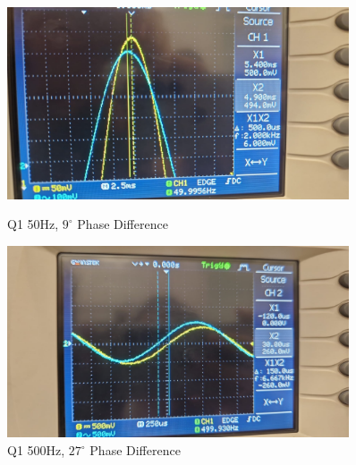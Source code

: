 \begin{figure}[h]
    \centering
    \begin{minipage}{0.5\textwidth}
        \includegraphics[width=0.9\textwidth , height=0.15\textheight]{assets/exp/q1-50Hz-1vpp-phase.jpeg}
        \caption{Q1 50Hz, $9^{\circ}$ Phase Difference}
        \label{fig:q1-50Hz-1vpp-phase}
    \end{minipage}%
    \begin{minipage}{0.5\textwidth}
        \includegraphics[width=0.9\textwidth , height=0.15\textheight]{assets/exp/q1-500Hz-1vpp-phase.jpeg}
        \caption{Q1 500Hz, $27^{\circ}$ Phase Difference}
        \label{fig:q1-500Hz-1vpp-phase}
    \end{minipage}
\end{figure}

\newpage
\thispagestyle{plain}

